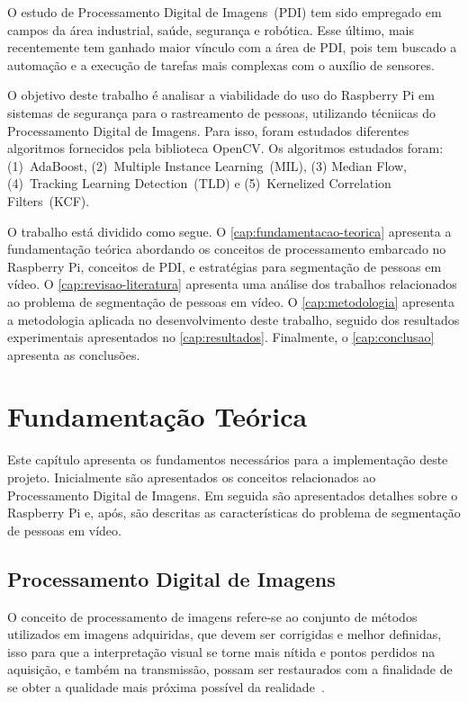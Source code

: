 \documentclass[12pt,oneside,a4paper,chapter=TITLE,section=TITLE,sumario=tradicional]{abntex2}
\begin{document}
O estudo de Processamento Digital de Imagens~(PDI) tem sido empregado em campos da área industrial, saúde, segurança e robótica. Esse último, mais recentemente tem ganhado maior vínculo com a área de PDI, pois tem buscado a automação e a execução de tarefas mais complexas com o auxílio de sensores.

O objetivo deste trabalho é analisar a viabilidade do uso do Raspberry Pi em sistemas de segurança para o rastreamento de pessoas, utilizando técniicas do Processamento Digital de Imagens. Para isso, foram estudados diferentes algoritmos fornecidos pela biblioteca OpenCV. Os algoritmos estudados foram: (1)~AdaBoost, (2)~Multiple Instance Learning~(MIL), (3) Median Flow, (4)~Tracking Learning Detection~(TLD) e (5)~Kernelized Correlation Filters~(KCF). 

O trabalho está dividido como segue. O \autoref{cap:fundamentacao-teorica} apresenta a fundamentação teórica abordando os conceitos de processamento embarcado no Raspberry Pi, conceitos de PDI, e estratégias para segmentação de pessoas em vídeo. O \autoref{cap:revisao-literatura} apresenta uma análise dos trabalhos relacionados ao problema de segmentação de pessoas em vídeo. O \autoref{cap:metodologia} apresenta a metodologia aplicada no desenvolvimento deste trabalho, seguido dos resultados experimentais apresentados no \autoref{cap:resultados}. Finalmente, o \autoref{cap:conclusao} apresenta as conclusões.


\chapter{Fundamentação Teórica}
\label{cap:fundamentacao-teorica}

Este capítulo apresenta os fundamentos necessários para a implementação deste projeto. Inicialmente são apresentados os conceitos relacionados ao Processamento Digital de Imagens. Em seguida são apresentados detalhes sobre o Raspberry Pi e, após, são descritas as características do problema de segmentação de pessoas em vídeo.


\section{Processamento Digital de Imagens}
\label{sec:pdi}

O conceito de processamento de imagens refere-se ao conjunto de métodos utilizados em imagens adquiridas, que devem ser corrigidas e melhor definidas, isso para que a interpretação visual se torne mais nítida e pontos perdidos na aquisição, e também na transmissão, possam ser restaurados com a finalidade de se obter a qualidade mais próxima possível da realidade~\cite{pdi2006}.
\end{document}
